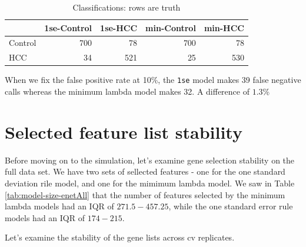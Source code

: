 \documentclass[
]{book}
\begin{document}
\begin{table}

\caption{\label{tab:hcc5hmC-glmnetSuiteB-enet-get-sample-class}Classifications: rows are truth}
\centering
\begin{tabular}[t]{l|r|r|r|r}
\hline
  & 1se-Control & 1se-HCC & min-Control & min-HCC\\
\hline
Control & 700 & 78 & 700 & 78\\
\hline
HCC & 34 & 521 & 25 & 530\\
\hline
\end{tabular}
\end{table}

When we fix the false positive rate at 10\%, the \texttt{1se} model makes 39 false
negative calls whereas the minimum lambda model makes 32. A difference
of \(1.3\)\%

\hypertarget{selected-feature-list-stability-2}{%
\section*{Selected feature list stability}\label{selected-feature-list-stability-2}}

Before moving on to the simulation, let's examine gene selection stability on the
full data set. We have two sets of sellected features - one for the
one standard deviation rile model, and one for the mimimum lambda model.
We saw in Table \ref{tab:model-size-enetAll} that the number of features
selected by the minimum lambda models had an IQR of
\(271.5-457.25\),
while the one standard error rule models had an IQR of
\(174-215\).

Let's examine the stability of the gene lists across cv replicates.
\end{document}
